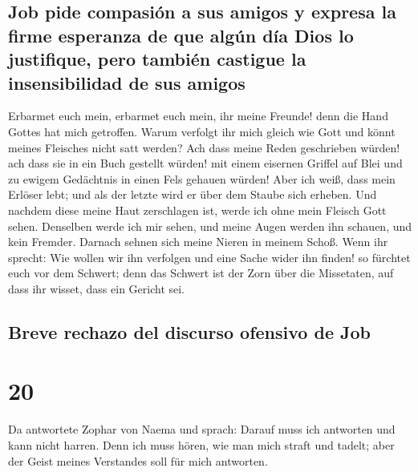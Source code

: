 \hypertarget{job-pide-compasiuxf3n-a-sus-amigos-y-expresa-la-firme-esperanza-de-que-alguxfan-duxeda-dios-lo-justifique-pero-tambiuxe9n-castigue-la-insensibilidad-de-sus-amigos}{%
\subsection{Job pide compasión a sus amigos y expresa la firme esperanza
de que algún día Dios lo justifique, pero también castigue la
insensibilidad de sus
amigos}\label{job-pide-compasiuxf3n-a-sus-amigos-y-expresa-la-firme-esperanza-de-que-alguxfan-duxeda-dios-lo-justifique-pero-tambiuxe9n-castigue-la-insensibilidad-de-sus-amigos}}

 Erbarmet euch mein, erbarmet euch mein, ihr meine
Freunde! denn die Hand Gottes hat mich getroffen.  Warum
verfolgt ihr mich gleich wie Gott und könnt meines Fleisches nicht satt
werden?  Ach dass meine Reden geschrieben würden! ach
dass sie in ein Buch gestellt würden!  mit einem eisernen
Griffel auf Blei und zu ewigem Gedächtnis in einen Fels gehauen würden!
 Aber ich weiß, dass mein Erlöser lebt; und als der
letzte wird er über dem Staube sich erheben.  Und nachdem
diese meine Haut zerschlagen ist, werde ich ohne mein Fleisch Gott
sehen.  Denselben werde ich mir sehen, und meine Augen
werden ihn schauen, und kein Fremder. Darnach sehnen sich meine Nieren
in meinem Schoß.  Wenn ihr sprecht: Wie wollen wir ihn
verfolgen und eine Sache wider ihn finden!  so fürchtet
euch vor dem Schwert; denn das Schwert ist der Zorn über die Missetaten,
auf dass ihr wisset, dass ein Gericht sei.

\hypertarget{breve-rechazo-del-discurso-ofensivo-de-job}{%
\subsection{Breve rechazo del discurso ofensivo de
Job}\label{breve-rechazo-del-discurso-ofensivo-de-job}}

\hypertarget{section-19}{%
\section{20}\label{section-19}}

 Da antwortete Zophar von Naema und sprach: 
Darauf muss ich antworten und kann nicht harren.  Denn ich
muss hören, wie man mich straft und tadelt; aber der Geist meines
Verstandes soll für mich antworten.

